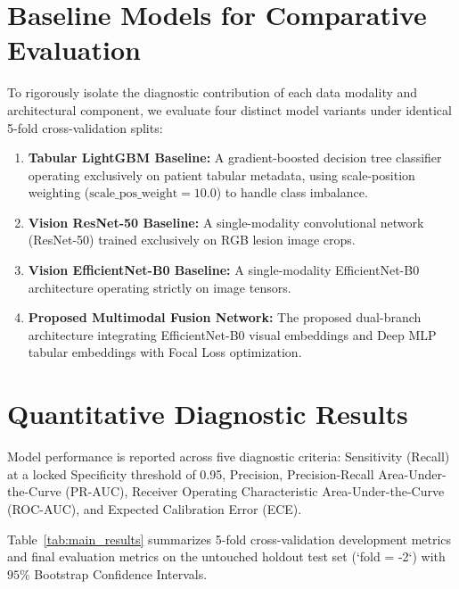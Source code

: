 \documentclass[12pt,a4paper]{report}
\begin{document}
	\section{Baseline Models for Comparative Evaluation}
	To rigorously isolate the diagnostic contribution of each data modality and architectural component, we evaluate four distinct model variants under identical 5-fold cross-validation splits:
	\begin{enumerate}
		\item \textbf{Tabular LightGBM Baseline:} A gradient-boosted decision tree classifier operating exclusively on patient tabular metadata, using scale-position weighting ($\text{scale\_pos\_weight} = 10.0$) to handle class imbalance.
		\item \textbf{Vision ResNet-50 Baseline:} A single-modality convolutional network (ResNet-50) trained exclusively on RGB lesion image crops.
		\item \textbf{Vision EfficientNet-B0 Baseline:} A single-modality EfficientNet-B0 architecture operating strictly on image tensors.
		\item \textbf{Proposed Multimodal Fusion Network:} The proposed dual-branch architecture integrating EfficientNet-B0 visual embeddings and Deep MLP tabular embeddings with Focal Loss optimization.
	\end{enumerate}
	
	\section{Quantitative Diagnostic Results}
	Model performance is reported across five diagnostic criteria: Sensitivity (Recall) at a locked Specificity threshold of 0.95, Precision, Precision-Recall Area-Under-the-Curve (PR-AUC), Receiver Operating Characteristic Area-Under-the-Curve (ROC-AUC), and Expected Calibration Error (ECE). 
	
	Table~\ref{tab:main_results} summarizes 5-fold cross-validation development metrics and final evaluation metrics on the untouched holdout test set (`fold = -2`) with $95\%$ Bootstrap Confidence Intervals.
	
\end{document}
